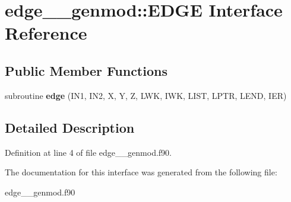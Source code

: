 \hypertarget{interfaceedge____genmod_1_1_e_d_g_e}{\section{edge\+\_\+\+\_\+genmod\+:\+:E\+D\+G\+E Interface Reference}
\label{interfaceedge____genmod_1_1_e_d_g_e}
}
\subsection*{Public Member Functions}
\begin{DoxyCompactItemize}
\item 
\hypertarget{interfaceedge____genmod_1_1_e_d_g_e_aa05814ea71a555be518b413cc307fcd1}{subroutine {\bfseries edge} (I\+N1, I\+N2, X, Y, Z, L\+W\+K, I\+W\+K, L\+I\+S\+T, L\+P\+T\+R, L\+E\+N\+D, I\+E\+R)}\label{interfaceedge____genmod_1_1_e_d_g_e_aa05814ea71a555be518b413cc307fcd1}

\end{DoxyCompactItemize}


\subsection{Detailed Description}


Definition at line 4 of file edge\+\_\+\+\_\+genmod.\+f90.



The documentation for this interface was generated from the following file\+:\begin{DoxyCompactItemize}
\item 
edge\+\_\+\+\_\+genmod.\+f90\end{DoxyCompactItemize}
